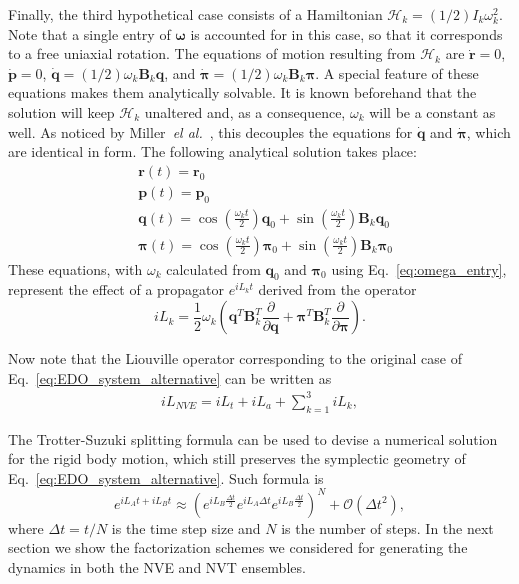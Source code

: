 \documentclass[aip,jcp,reprint,amsmath,amssymb]{revtex4-1}
\newcommand{\mt}[1]{\boldsymbol{\mathbf{#1}}}           %
\newcommand{\vt}[1]{\boldsymbol{\mathbf{#1}}}           %
\newcommand{\tr}[1]{#1^T}                               %
\newcommand{\diff}[2]{\dfrac{\partial #1}{\partial #2}} %
\begin{document}
Finally, the third hypothetical case consists of a Hamiltonian $\mathcal{H}_k = (1/2) I_k \omega_k^2$. Note that a single entry of $\vt \omega$ is accounted for in this case, so that it corresponds to a free uniaxial rotation. The equations of motion resulting from $\mathcal{H}_k$ are $\dot{\vt r} = 0$, $\dot{\vt p} = 0$, $\dot{\vt q} = (1/2) \omega_k {\mt B}_k \vt q$, and $\dot{\vt \pi} = (1/2) \omega_k {\mt B}_k \vt \pi$. A special feature of these equations makes them analytically solvable. It is known beforehand that the solution will keep $\mathcal{H}_k$ unaltered and, as a consequence, $\omega_k$ will be a constant as well. As noticed by Miller~\textit{el al.}~\cite{Miller2002}, this decouples the equations for $\dot{\vt q}$ and $\dot{\vt \pi}$, which are identical in form. The following analytical solution takes place:\cite{Miller2002}
\begin{align}
&{\vt r}(t) = {\vt r}_0 \\
&{\vt p}(t) = {\vt p}_0 \\
&{\vt q}(t) = \cos\left(\frac{\omega_k t}{2}\right) \vt q_0 + \sin\left(\frac{\omega_k t}{2}\right) \mt B_k \vt q_0 \\
&{\vt \pi}(t) = \cos\left(\frac{\omega_k t}{2}\right) \vt \pi_0 + \sin\left(\frac{\omega_k t}{2}\right) \mt B_k \vt \pi_0
\end{align}
These equations, with $\omega_k$ calculated from $\vt q_0$ and $\vt \pi_0$ using Eq.~\ref{eq:omega_entry}, represent the effect of a propagator $e^{i L_k t}$ derived from the operator
\[
i L_k = \frac{1}{2} \omega_k \left( \tr{\vt q}\tr{{\mt B}_k} \diff{}{\vt q} + \tr{\vt \pi}\tr{{\mt B}_k} \diff{}{\vt \pi} \right).
\]

Now note that the Liouville operator corresponding to the original case of Eq.~\ref{eq:EDO_system_alternative} can be written as
\begin{align}
\label{eq:full_operator}
i L_{NVE} = i L_t + i L_a + \sum_{k=1}^3 i L_k,
\end{align}

The Trotter-Suzuki splitting formula\cite{Trotter1959, Suzuki1976} can be used to devise a numerical solution for the rigid body motion, which still preserves the symplectic geometry of Eq.~\ref{eq:EDO_system_alternative}. Such formula is
\[
e^{i L_A t + i L_B t} \approx \left( e^{i L_B \frac{\Delta t}{2}} e^{i L_A \Delta t} e^{i L_B \frac{\Delta t}{2}} \right)^N + \mathcal{O}(\Delta t^2),
\]
where $\Delta t = t/N$ is the time step size and $N$ is the number of steps. In the next section we show the factorization schemes we considered for generating the dynamics in both the NVE and NVT ensembles.
\end{document}
